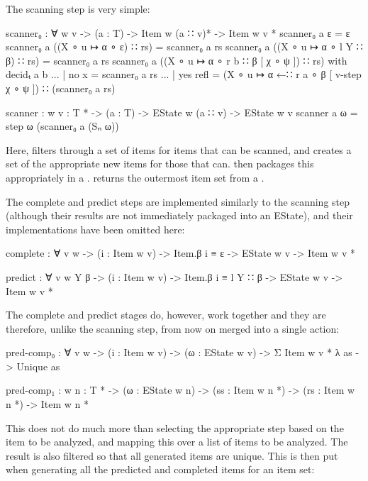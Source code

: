 		The scanning step is very simple:

		\begin{code}
			scanner₀ : ∀ {w v} ->
			  (a : T) ->
			  Item w (a ∷ v)* ->
			  Item w v *
			scanner₀ a ε = ε
			scanner₀ a ((X ∘ u ↦ α ∘ ε) ∷ rs) = scanner₀ a rs
			scanner₀ a ((X ∘ u ↦ α ∘ l Y ∷ β) ∷ rs) = scanner₀ a rs
			scanner₀ a ((X ∘ u ↦ α ∘ r b ∷ β [ χ ∘ ψ ]) ∷ rs) with decidₜ a b
			... | no x = scanner₀ a rs
			... | yes refl =
			  (X ∘ u ↦ α ←∷ r a ∘ β [ v-step χ ∘ ψ ]) ∷ (scanner₀ a rs)

			scanner : {w v : T *} ->
			  (a : T) ->
			  EState w (a ∷ v) ->
			  EState w v
			scanner a ω = step ω (scanner₀ a (Sₙ ω))
		\end{code}

		Here,  filters through a set of items for items that
		can be scanned, and creates a set of the appropriate new items for
		those that can.  then packages this appropriately in a
		.  returns the outermost item set from a
		.

		The complete and predict steps are implemented similarly to the
		scanning step (although their results are not immediately packaged into
		an EState), and their implementations have been omitted here:

		\begin{code}
			complete : ∀ {v w} -> (i : Item w v) -> Item.β i ≡ ε ->
			  EState w v -> Item w v *

			predict : ∀ {v w Y β} -> (i : Item w v) -> Item.β i ≡ l Y ∷ β ->
			  EState w v -> Item w v *
		\end{code}

 		The complete and predict stages do, however, work together and they are
 		therefore, unlike the scanning step, from now on merged into a single
 		action:

		\begin{code}
			pred-comp₀ : ∀ {v w} ->
			  (i : Item w v) ->
			  (ω : EState w v) ->
			  Σ {Item w v *} λ as -> Unique as

			pred-comp₁ : {w n : T *} -> (ω : EState w n) ->
			  (ss : Item w n *) -> (rs : Item w n *) -> Item w n *
		\end{code}

		This does not do much more than selecting the appropriate step based on
		the item to be analyzed, and mapping this over a list of items to be
		analyzed. The result is also filtered so that all generated items are
		unique. This is then put when generating all the predicted and
		completed items for an item set:

